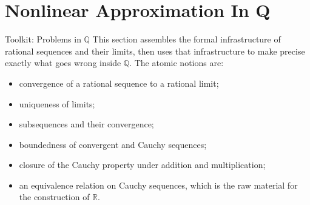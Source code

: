 \section{Nonlinear Approximation In Q}

\begin{toolkitbox}{Toolkit: Problems in $\mathbb{Q}$}
This section assembles the formal infrastructure of rational sequences and
their limits, then uses that infrastructure to make precise exactly what goes
wrong inside $\mathbb{Q}$. The atomic notions are:
\begin{itemize}
  \item convergence of a rational sequence to a rational limit;
  \item uniqueness of limits;
  \item subsequences and their convergence;
  \item boundedness of convergent and Cauchy sequences;
  \item closure of the Cauchy property under addition and multiplication;
  \item an equivalence relation on Cauchy sequences, which is the
        raw material for the construction of $\mathbb{R}$.
\end{itemize}
\end{toolkitbox}




